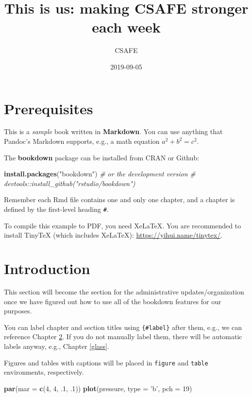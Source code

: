 \documentclass[]{book}
\title{This is us: making CSAFE stronger each week}
\author{CSAFE}
\date{2019-09-05}
\newenvironment{Shaded}{\begin{snugshade}}{\end{snugshade}}
\newcommand{\CommentTok}[1]{\textcolor[rgb]{0.56,0.35,0.01}{\textit{#1}}}
\newcommand{\DataTypeTok}[1]{\textcolor[rgb]{0.13,0.29,0.53}{#1}}
\newcommand{\DecValTok}[1]{\textcolor[rgb]{0.00,0.00,0.81}{#1}}
\newcommand{\FloatTok}[1]{\textcolor[rgb]{0.00,0.00,0.81}{#1}}
\newcommand{\KeywordTok}[1]{\textcolor[rgb]{0.13,0.29,0.53}{\textbf{#1}}}
\newcommand{\NormalTok}[1]{#1}
\newcommand{\StringTok}[1]{\textcolor[rgb]{0.31,0.60,0.02}{#1}}
\begin{document}
\maketitle

{
\setcounter{tocdepth}{1}
\tableofcontents
}
\hypertarget{prerequisites}{%
\chapter{Prerequisites}\label{prerequisites}}

This is a \emph{sample} book written in \textbf{Markdown}. You can use anything that Pandoc's Markdown supports, e.g., a math equation \(a^2 + b^2 = c^2\).

The \textbf{bookdown} package can be installed from CRAN or Github:

\begin{Shaded}
\begin{Highlighting}[]
\KeywordTok{install.packages}\NormalTok{(}\StringTok{"bookdown"}\NormalTok{)}
\CommentTok{# or the development version}
\CommentTok{# devtools::install_github("rstudio/bookdown")}
\end{Highlighting}
\end{Shaded}

Remember each Rmd file contains one and only one chapter, and a chapter is defined by the first-level heading \texttt{\#}.

To compile this example to PDF, you need XeLaTeX. You are recommended to install TinyTeX (which includes XeLaTeX): \url{https://yihui.name/tinytex/}.

\hypertarget{intro}{%
\chapter{Introduction}\label{intro}}

This section will become the section for the administrative updates/organization once we have figured out how to use all of the bookdown features for our purposes.

You can label chapter and section titles using \texttt{\{\#label\}} after them, e.g., we can reference Chapter \ref{intro}. If you do not manually label them, there will be automatic labels anyway, e.g., Chapter \ref{glass}.

Figures and tables with captions will be placed in \texttt{figure} and \texttt{table} environments, respectively.

\begin{Shaded}
\begin{Highlighting}[]
\KeywordTok{par}\NormalTok{(}\DataTypeTok{mar =} \KeywordTok{c}\NormalTok{(}\DecValTok{4}\NormalTok{, }\DecValTok{4}\NormalTok{, }\FloatTok{.1}\NormalTok{, }\FloatTok{.1}\NormalTok{))}
\KeywordTok{plot}\NormalTok{(pressure, }\DataTypeTok{type =} \StringTok{'b'}\NormalTok{, }\DataTypeTok{pch =} \DecValTok{19}\NormalTok{)}
\end{Highlighting}
\end{Shaded}
\end{document}
